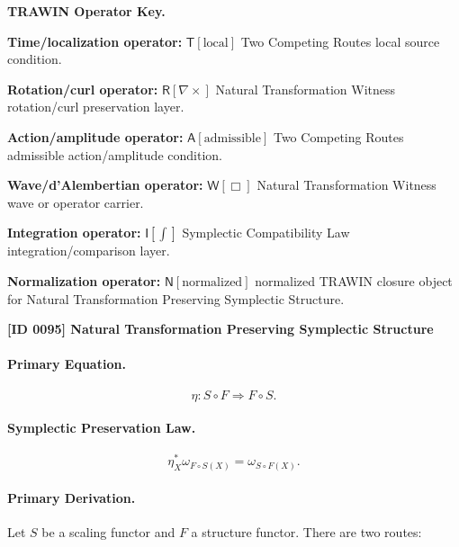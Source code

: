 \par\vspace{0.45\baselineskip}
\noindent\begin{minipage}[t]{\linewidth}
\begingroup
\small
\raggedright
\textbf{TRAWIN Operator Key.}\par
\noindent\textbf{Time/localization operator:} $\mathsf{T}\!\left[\mathrm{local}\right]$ Two Competing Routes local source condition.\par
\noindent\textbf{Rotation/curl operator:} $\mathsf{R}\!\left[\nabla\times\right]$ Natural Transformation Witness rotation/curl preservation layer.\par
\noindent\textbf{Action/amplitude operator:} $\mathsf{A}\!\left[\mathrm{admissible}\right]$ Two Competing Routes admissible action/amplitude condition.\par
\noindent\textbf{Wave/d'Alembertian operator:} $\mathsf{W}\!\left[\Box\right]$ Natural Transformation Witness wave or operator carrier.\par
\noindent\textbf{Integration operator:} $\mathsf{I}\!\left[\int\right]$ Symplectic Compatibility Law integration/comparison layer.\par
\noindent\textbf{Normalization operator:} $\mathsf{N}\!\left[\mathrm{normalized}\right]$ normalized TRAWIN closure object for Natural Transformation Preserving Symplectic Structure.\par
\endgroup
\end{minipage}

\clearpage
\noindent\textbf{[ID 0095] Natural Transformation Preserving Symplectic Structure}\par
\vspace{0.35em}
\paragraph{Primary Equation.}
\begin{equation}
\eta:S\circ F\Rightarrow F\circ S.
\end{equation}

\paragraph{Symplectic Preservation Law.}
\begin{equation}
\eta_X^{*}\omega_{F\circ S(X)}
=
\omega_{S\circ F(X)}.
\end{equation}

\paragraph{Primary Derivation.}
Let $S$ be a scaling functor and $F$ a structure functor.  
There are two routes:

